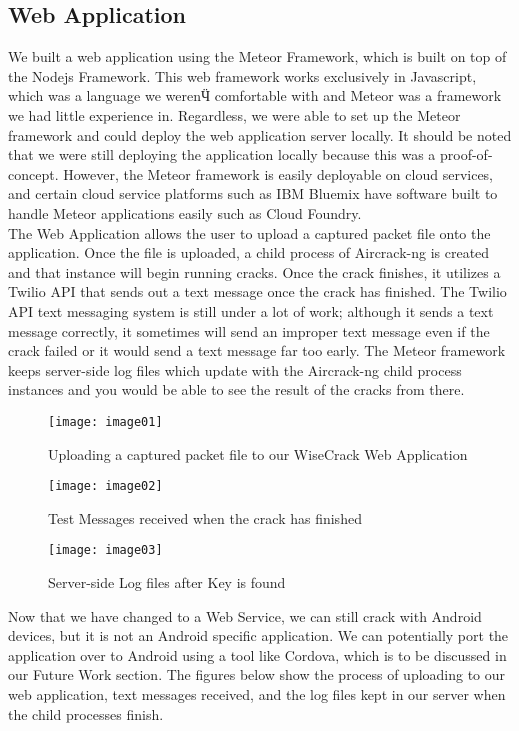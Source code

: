 \documentclass[12pt, titlepage]{article}
\begin{document}
\subsection{Web Application}
We built a web application using the Meteor Framework, which is built on top of the Nodejs Framework. This web framework works exclusively in Javascript, which was a language we werenӴ comfortable with and Meteor was a framework we had little experience in. Regardless, we were able to set up the Meteor framework and could deploy the web application server locally. It should be noted that we were still deploying the application locally because this was a proof-of-concept. However, the Meteor framework is easily deployable on cloud services, and certain cloud service platforms such as IBM Bluemix have software built to handle Meteor applications easily such as Cloud Foundry.
\\
The Web Application allows the user to upload a captured packet file onto the application. Once the file is uploaded, a child process of Aircrack-ng is created and that instance will begin running cracks. Once the crack finishes, it utilizes a Twilio API that sends out a text message once the crack has finished. The Twilio API text messaging system is still under a lot of work; although it sends a text message correctly, it sometimes will send an improper text message even if the crack failed or it would send a text message far too early. The Meteor framework keeps server-side log files which update with the Aircrack-ng child process instances and you would be able to see the result of the cracks from there. 
\\ 
\begin{figure}
\centering
\texttt{[image: image01]}
\caption{Uploading a captured packet file to our WiseCrack Web Application}
\label{fig:01}
\end{figure}

\begin{figure}
\centering
\texttt{[image: image02]}
\caption{Test Messages received when the crack has finished}
\label{fig:02}
\end{figure}

\begin{figure}
\centering
\texttt{[image: image03]}
\caption{Server-side Log files after Key is found}
\label{fig:03}
\end{figure}

Now that we have changed to a Web Service, we can still crack with Android devices, but it is not an Android specific application. We can potentially port the application over to Android using a tool like Cordova, which is to be discussed in our Future Work section. The figures below show the process of uploading to our web application, text messages received, and the log files kept in our server when the child processes finish.
\end{document}
